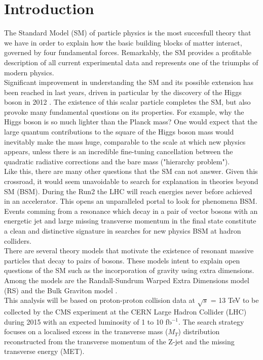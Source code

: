 \chapter{Introduction}

The Standard Model (SM) of particle physics is the most succesfull theory that we have in order to explain how the basic building blocks of matter interact, governed by four fundamental forces.
Remarkably, the SM provides a profitable description of all current experimental data and represents one of the triumphs of modern physics.\\
\indent
Significant improvement in understanding the SM and its possible extension has been reached in last years, driven in particular by the discovery of the Higgs boson in 2012 \cite{higgsdisco}. The existence of this scalar particle completes the SM, but also provoke many fundamental questions on its properties. 
For example, why the Higgs boson is so much lighter than the Planck mass? One would expect that the large quantum contributions to the square of the Higgs boson mass would inevitably make the mass huge, comparable to the scale at which new physics appears, unless there is an incredible fine-tuning cancellation between the quadratic radiative corrections and the bare mass ("hierarchy problem").\\
\indent
Like this, there are many other questions that the SM can not answer. Given this crossroad, it would seem unavoidable to search for explanation in theories beyond SM (BSM). During the Run2 the LHC will reach energies never before achieved in an accelerator. This opens an unparalleled portal to look for phenomena BSM.\\
\indent
Events comming from a resonance which decay in a pair of vector bosons with an energetic jet and large missing transverse momentum in the final state constitute a clean and distinctive signature in searches for new physics BSM at hadron colliders.\\
\indent
There are several theory models that motivate the existence of resonant massive particles that decay to pairs of bosons. These models intent to explain open questions of the SM such as the incorporation of gravity using extra dimensions. Among the models  are the Randall-Sundrum Warped Extra Dimensions model (RS) \cite{Randall:1999ee,Randall:1999vf} and the Bulk Graviton model \cite{Aga,Fitz}.\\
\indent
This analysis will be based on proton-proton collision data at $\sqrt{s}$ = 13 TeV to be collected by the CMS experiment at the CERN Large Hadron Collider (LHC) during 2015 with an expected luminosity of 1 to 10 fb$^{-1}$. The search strategy focuses on a localised excess in the transverse mass ($M_T$) distribution reconstructed from the transverse momentum of the Z-jet and the missing transverse energy (MET).\\ 
